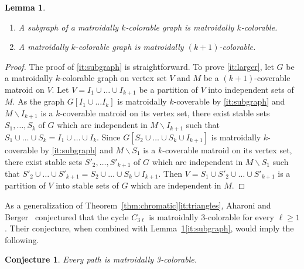 \documentclass[11pt,a4paper]{article}
\theoremstyle{plain}
\newtheorem{lem}[thm]{Lemma}
\newtheorem{conj}{Conjecture}
\theoremstyle{definition}
\begin{document}
\begin{lem} \label{lem:col}
\mbox{}
\begin{enumerate}[label=(\alph*)]\itemsep0em
    \item A subgraph of a matroidally $k$-colorable graph is matroidally $k$-colorable. \label{it:subgraph}
    \item A matroidally $k$-colorable graph is matroidally $(k+1)$-colorable. \label{it:larger}
\end{enumerate}
\end{lem}
\begin{proof}
The proof of \ref{it:subgraph} is straightforward. To prove \ref{it:larger}, let $G$ be a matroidally $k$-colorable graph on vertex set $V$ and $M$ be a $(k+1)$-coverable matroid on $V$. Let $V= I_1 \cup \dots \cup I_{k+1}$ be a partition of $V$ into independent sets of $M$. As the graph $G[I_1 \cup \dots I_k]$ is matroidally $k$-coverable by \ref{it:subgraph} and $M\backslash I_{k+1}$ is a $k$-coverable matroid on its vertex set, there exist stable sets $S_1,\dots, S_k$ of $G$ which are independent in $M\backslash I_{k+1}$ such that $S_1 \cup \dots \cup S_k = I_1 \cup \dots \cup I_k$. Since $G[S_2 \cup \dots \cup S_k \cup I_{k+1}]$ is matroidally $k$-coverable by \ref{it:subgraph} and $M\backslash S_1$ is a $k$-coverable matroid on its vertex set, there exist stable sets $S'_2, \dots, S'_{k+1}$ of $G$ which are independent in $M \backslash S_1$ such that $S'_2 \cup \dots\cup S'_{k+1} = S_2  \cup \dots \cup S_k \cup I_{k+1}$. Then $V=S_1\cup S'_2 \cup \dots \cup S'_{k+1}$ is a partition of $V$ into stable sets of $G$ which are independent in $M$.
\end{proof}

As a generalization of Theorem~\ref{thm:chromatic}\ref{it:triangles}, Aharoni and Berger~\cite{aharoni2006intersection} conjectured that the cycle $C_{3\ell}$ is matroidally 3-colorable for every $\ell\geq 1$. Their conjecture, when combined with Lemma~\ref{lem:col}\ref{it:subgraph}, would imply the following.

\begin{conj}\label{conj:pathcol} 
Every path is matroidally 3-colorable.
\end{conj}
\end{document}
